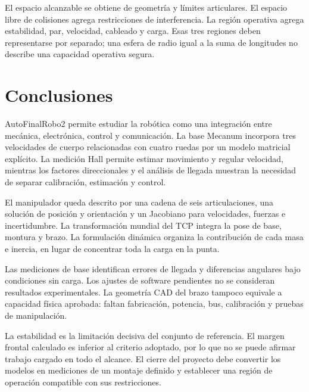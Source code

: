 El espacio alcanzable se obtiene de geometría y límites articulares. El espacio libre de colisiones agrega restricciones de interferencia. La región operativa agrega estabilidad, par, velocidad, cableado y carga. Esas tres regiones deben representarse por separado; una esfera de radio igual a la suma de longitudes no describe una capacidad operativa segura.

\section{Conclusiones}
AutoFinalRobo2 permite estudiar la robótica como una integración entre mecánica, electrónica, control y comunicación. La base Mecanum incorpora tres velocidades de cuerpo relacionadas con cuatro ruedas por un modelo matricial explícito. La medición Hall permite estimar movimiento y regular velocidad, mientras los factores direccionales y el análisis de llegada muestran la necesidad de separar calibración, estimación y control.

El manipulador queda descrito por una cadena de seis articulaciones, una solución de posición y orientación y un Jacobiano para velocidades, fuerzas e incertidumbre. La transformación mundial del TCP integra la pose de base, montura y brazo. La formulación dinámica organiza la contribución de cada masa e inercia, en lugar de concentrar toda la carga en la punta.

Las mediciones de base identifican errores de llegada y diferencias angulares bajo condiciones sin carga. Los ajustes de software pendientes no se consideran resultados experimentales. La geometría CAD del brazo tampoco equivale a capacidad física aprobada: faltan fabricación, potencia, bus, calibración y pruebas de manipulación.

La estabilidad es la limitación decisiva del conjunto de referencia. El margen frontal calculado es inferior al criterio adoptado, por lo que no se puede afirmar trabajo cargado en todo el alcance. El cierre del proyecto debe convertir los modelos en mediciones de un montaje definido y establecer una región de operación compatible con sus restricciones.
\FloatBarrier
